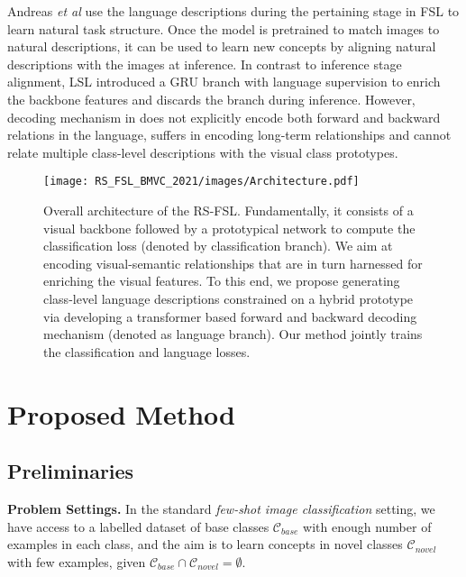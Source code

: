 \documentclass{bmvc2k}
\def\etal{\emph{et al}\bmvaOneDot}
\begin{document}
Andreas \etal \cite{andreas2017learning} use the language descriptions during the pertaining stage in FSL to learn natural task structure. Once the model is pretrained to match images to natural descriptions, it can be used to learn new concepts by aligning natural descriptions with the images at inference. In contrast to inference stage alignment, LSL \cite{mu2020shaping} introduced a GRU branch with language supervision to enrich the backbone features and discards the branch during inference. However, decoding mechanism in \cite{mu2020shaping,andreas2017learning} does not explicitly encode both forward and backward relations in the language, suffers in encoding long-term relationships and cannot relate multiple class-level descriptions with the visual class prototypes. 



\begin{figure}[t]
    \centering
    \texttt{[image: RS\_FSL\_BMVC\_2021/images/Architecture.pdf]}\vspace{-1em}
    \caption{Overall architecture of the RS-FSL. Fundamentally, it consists of a visual backbone followed by a prototypical network to compute the classification loss (denoted by classification branch). We aim at encoding visual-semantic relationships that are in turn harnessed for enriching the visual features. To this end, we propose generating class-level language descriptions constrained on a hybrid prototype via developing a transformer based forward and backward decoding mechanism (denoted as language branch). Our method jointly trains the classification and language losses.} 
\label{fig:overall_architecture}
\end{figure}
\section{Proposed Method}
\subsection{Preliminaries}
\label{subsection:Preliminaries}

\noindent \textbf{Problem Settings.} In the standard \textit{few-shot image classification} setting, we have access to a labelled dataset of base classes $\mathcal{C}_{base}$ with enough number of examples in each class, and the aim is to learn concepts in novel classes $\mathcal{C}_{novel}$ with few examples, given $\mathcal{C}_{base} \cap \mathcal{C}_{novel}= \emptyset$. 
\end{document}

